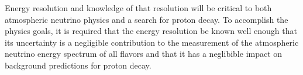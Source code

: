 Energy resolution and knowledge of that resolution will be critical to both
atmospheric neutrino physics and a search for proton decay.  To accomplish the
physics goals, it is required that the energy resolution be known well enough that
its uncertainty is a negligible contribution to the measurement of the
atmospheric neutrino energy spectrum of all flavors and that it has a neglibible
impact on background predictions for proton decay.



